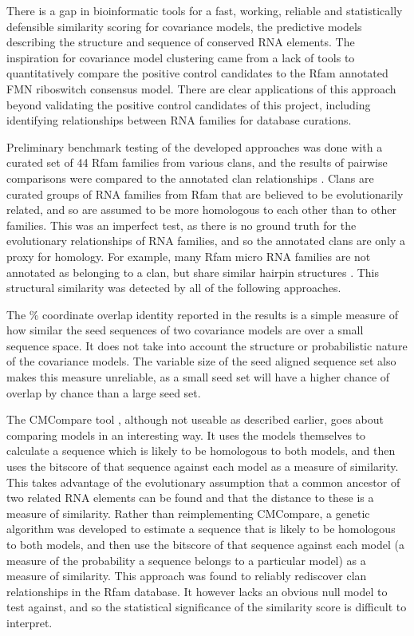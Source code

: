 There is a gap in bioinformatic tools for a fast, working, reliable and statistically defensible similarity scoring for covariance models, the predictive models describing the structure and sequence of conserved RNA elements.
The inspiration for covariance model clustering came from a lack of tools to quantitatively compare the positive control candidates to the Rfam annotated \ac{FMN} riboswitch consensus model.
There are clear applications of this approach beyond validating the positive control candidates of this project, including identifying relationships between RNA families for database curations.

Preliminary benchmark testing of the developed approaches was done with a curated set of 44 Rfam families from various clans, and the results of pairwise comparisons were compared to the annotated clan relationships \citep{Ontiveros-Palacios2025}.
Clans are curated groups of RNA families from Rfam that are believed to be evolutionarily related, and so are assumed to be more homologous to each other than to other families.
This was an imperfect test, as there is no ground truth for the evolutionary relationships of RNA families, and so the annotated clans are only a proxy for homology.
For example, many Rfam micro RNA families are not annotated as belonging to a clan, but share similar hairpin structures \citep{Xue2005}.
This structural similarity was detected by all of the following approaches.

The \% coordinate overlap identity reported in the results is a simple measure of how similar the seed sequences of two covariance models are over a small sequence space.
It does not take into account the structure or probabilistic nature of the covariance models.
The variable size of the seed aligned sequence set also makes this measure unreliable, as a small seed set will have a higher chance of overlap by chance than a large seed set.

The CMCompare tool \citep{Eggenhofer2013}, although not useable as described earlier, goes about comparing models in an interesting way.
It uses the models themselves to calculate a sequence which is likely to be homologous to both models, and then uses the bitscore of that sequence against each model as a measure of similarity.
This takes advantage of the evolutionary assumption that a common ancestor of two related RNA elements can be found and that the distance to these is a measure of similarity.
Rather than reimplementing CMCompare, a genetic algorithm was developed to estimate a sequence that is likely to be homologous to both models, and then use the bitscore of that sequence against each model (a measure of the probability a sequence belongs to a particular model) as a measure of similarity.
This approach was found to reliably rediscover clan relationships in the Rfam database.
It however lacks an obvious null model to test against, and so the statistical significance of the similarity score is difficult to interpret.

